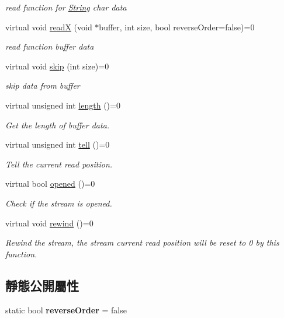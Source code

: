 \begin{DoxyCompactItemize}
\begin{DoxyCompactList}\small\item\em read function for \hyperlink{class_magnum_1_1_string}{String} char data \end{DoxyCompactList}\item 
virtual void \hyperlink{class_magnum_1_1_input_stream_ab514aac8cc4042273ce97e919836703b}{readX} (void $\ast$buffer, int size, bool reverse\+Order=false)=0
\begin{DoxyCompactList}\small\item\em read function buffer data \end{DoxyCompactList}\item 
virtual void \hyperlink{class_magnum_1_1_input_stream_aafc4188de8ca8d84cfab1c109e0a4113}{skip} (int size)=0
\begin{DoxyCompactList}\small\item\em skip data from buffer \end{DoxyCompactList}\item 
virtual unsigned int \hyperlink{class_magnum_1_1_input_stream_ab6d6c6089277296d49459011fc3bffb5}{length} ()=0
\begin{DoxyCompactList}\small\item\em Get the length of buffer data. \end{DoxyCompactList}\item 
virtual unsigned int \hyperlink{class_magnum_1_1_input_stream_a244ca3d979b3e9fdef2721780db89adc}{tell} ()=0
\begin{DoxyCompactList}\small\item\em Tell the current read position. \end{DoxyCompactList}\item 
virtual bool \hyperlink{class_magnum_1_1_input_stream_adf0fafef2b18906f4be2145d64f9acc7}{opened} ()=0
\begin{DoxyCompactList}\small\item\em Check if the stream is opened. \end{DoxyCompactList}\item 
virtual void \hyperlink{class_magnum_1_1_input_stream_af6156ecb8c82e061a158730bd497e5ed}{rewind} ()=0
\begin{DoxyCompactList}\small\item\em Rewind the stream, the stream current read position will be reset to 0 by this function. \end{DoxyCompactList}\end{DoxyCompactItemize}
\subsection*{靜態公開屬性}
\begin{DoxyCompactItemize}
\item 
static bool {\bfseries reverse\+Order} = false\hypertarget{class_magnum_1_1_input_stream_a20a663b7d0521263583ceace853ddd60}{}\label{class_magnum_1_1_input_stream_a20a663b7d0521263583ceace853ddd60}

\end{DoxyCompactItemize}


